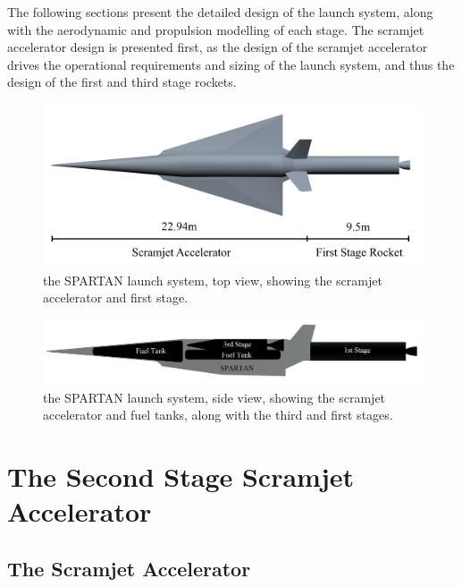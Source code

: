  The following sections present the detailed design of the launch system, along with the aerodynamic and propulsion modelling of each stage.
The scramjet accelerator design is presented first, as the design of the scramjet accelerator drives the operational requirements and sizing of the launch system, and thus the design of the first and third stage rockets. 


\begin{figure}[ht]
	\centering
	\includegraphics[width=0.85\linewidth]{figures/3_vehicle_design/NoInternal}
	\caption{the SPARTAN launch system, top view, showing the scramjet accelerator and first stage. }
	\label{fig:NoInternal}
\end{figure}

\begin{figure}[ht]
	\centering
	\includegraphics[width=0.85\linewidth]{figures/3_vehicle_design/INTERNALS}
	\caption{the SPARTAN launch system, side view, showing the scramjet accelerator and fuel tanks, along with the third and first stages. }
	\label{fig:INTERNALS}
\end{figure}









	
	
	\section{The Second Stage Scramjet Accelerator}\label{sec:SPARTAN}
 
		\subsection{The Scramjet Accelerator}
		
